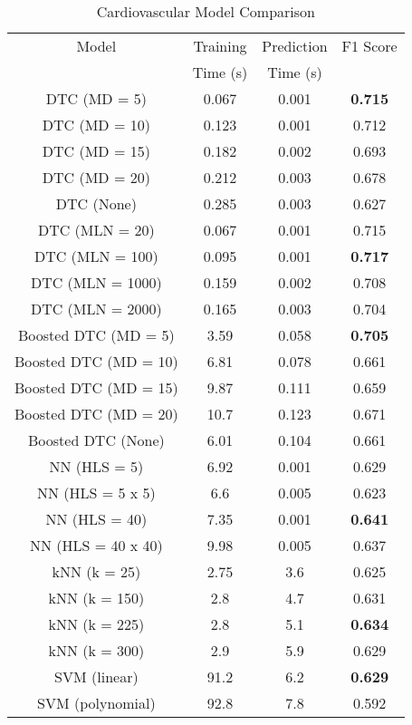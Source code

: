 \documentclass[10pt,journal,compsoc]{IEEEtran}
\begin{document}
\begin{table} 
\begin{center}
	\caption {Cardiovascular Model Comparison} 
	\begin{tabular}{ | c | c | c | c | } 
		
		Model & Training & Prediction & F1 Score \\ 
		& Time (s) & Time (s) & \\
		\hline
		DTC (MD = 5) & 0.067 &  0.001 & \textbf{0.715} \\ 
		\hline
		DTC (MD = 10) & 0.123 & 0.001 & 0.712 \\ 
		\hline
		DTC (MD = 15) & 0.182 & 0.002 & 0.693 \\ 
		\hline
		DTC (MD = 20) & 0.212 & 0.003 & 0.678 \\ 
		\hline
		DTC (None) & 0.285 &  0.003 & 0.627 \\ 
		\hline
		DTC (MLN = 20) & 0.067 & 0.001 & 0.715 \\ 
		\hline
		DTC (MLN = 100) & 0.095 & 0.001 & \color{green}\textbf{0.717} \\ 
		\hline
		DTC (MLN = 1000) & 0.159 & 0.002 & 0.708 \\ 
		\hline
		DTC (MLN = 2000) & 0.165 & 0.003 & 0.704 \\ 
		\hline
		Boosted DTC (MD = 5) & 3.59 & 0.058 & \textbf{0.705} \\ 
		\hline
		Boosted DTC (MD = 10) & 6.81 & 0.078 & 0.661 \\ 
		\hline
		Boosted DTC (MD = 15) & 9.87 & 0.111 & 0.659 \\ 
		\hline
		Boosted DTC (MD = 20) & 10.7 & 0.123 & 0.671 \\ 
		\hline
		Boosted DTC (None) & 6.01 & 0.104 & 0.661 \\ 
		\hline
		NN (HLS = 5) & 6.92 & 0.001 & 0.629 \\ 
		\hline
		NN (HLS = 5 x 5) & 6.6 & 0.005 & 0.623 \\ 
		\hline
		NN (HLS = 40) & 7.35 & 0.001 & \textbf{0.641} \\ 
		\hline
		NN (HLS = 40 x 40) & 9.98 & 0.005 & 0.637 \\ 
		\hline
		kNN (k = 25) & 2.75 & 3.6 & 0.625 \\ 
		\hline
		kNN (k = 150) & 2.8 & 4.7 & 0.631 \\ 
		\hline
		kNN (k = 225) & 2.8 & 5.1 & \textbf{0.634} \\ 
		\hline
		kNN (k = 300) & 2.9 & 5.9 & 0.629 \\ 
		\hline
		SVM (linear) & 91.2 & 6.2 & \textbf{0.629} \\ 
		\hline
		SVM (polynomial) & 92.8 & 7.8 & \color{red}0.592 \\ 
		\hline
	\end{tabular}
\end{center}
\end{table}
\end{document}

